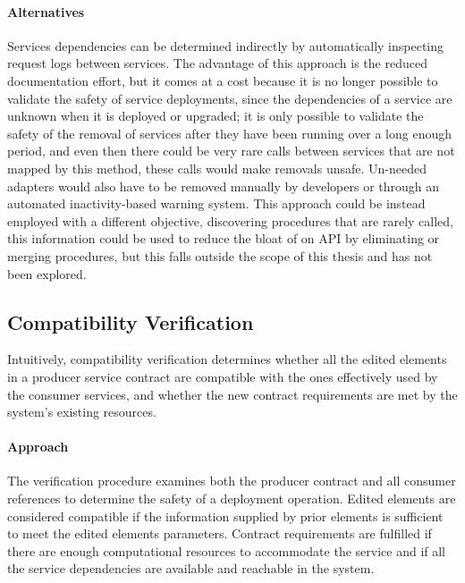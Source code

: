 \paragraph{Alternatives}
Services dependencies can be determined indirectly by automatically inspecting request logs between services.
The advantage of this approach is the reduced documentation effort, but it comes at a cost because
it is no longer possible to validate the safety of service deployments, since the dependencies of a service are unknown when it is deployed or upgraded;
it is only possible to validate the safety of the removal of services after they have been running over a long enough period,
and even then there could be very rare calls between services that are not mapped by this method, these calls would make removals unsafe.
Un-needed adapters would also have to be removed manually by developers or through an automated inactivity-based warning system.
This approach could be instead employed with a different objective, discovering procedures that are rarely called,
this information could be used to reduce the bloat of on API by eliminating or merging procedures,
but this falls outside the scope of this thesis and has not been explored.


\subsection{Compatibility Verification} %
\label{sec:compatibility_verification}

Intuitively, compatibility verification determines whether
all the edited elements in a producer service contract are compatible with the ones effectively
used by the consumer services, and whether the new contract requirements are met
by the system’s existing resources.

\paragraph{Approach}
The verification procedure examines both the producer contract and all consumer references to determine the safety of a deployment operation.
Edited elements are considered compatible if the information supplied by prior elements is sufficient to meet the edited elements parameters.
Contract requirements are fulfilled if there are enough computational resources to accommodate the service and if all the
service dependencies are available and reachable in the system.

